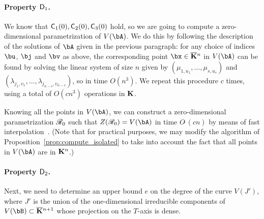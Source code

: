 \documentclass[12pt]{article}
\begin{document}
\paragraph{Property $\mathsf{D}_1$.} We know that $\mathsf{C}_1(0),\mathsf{C}_2(0),\mathsf{C}_3(0)$
hold, so we are going to compute a zero-dimensional parametrization of
$V(\bA)$.  We do this by following the description of the solutions of
$\bA$ given in the previous paragraph: for any choice of indices
$\bu$, $\bj$ and $\bv$ as above, the corresponding point $\bx \in
\KKbar{}^n$ in $V(\bA)$ can be found by solving the linear system of
size $n$ given by $(\mu_{1,u_1},\dots,\mu_{s,u_s})$ and
$(\lambda_{j_1,v_1},\dots,\lambda_{j_{n-s},v_{n-s}})$, so in time
$O(n^3)$. We repeat this procedure $c$ times, using a total of $O(c
n^3)$ operations in $\mathbf{K}$.

Knowing all the points in $V(\bA)$, we can construct a zero-dimensional
parametrization $\mathscr{R}_0$ such that $Z(\scrR_0)=V(\bA)$ in time
$O\tilde{~}(cn)$ by means of fast interpolation~\cite[Chapter~10]{GaGe03}.
(Note that for practical purposes, we may modify the algorithm
of Proposition~\ref{prop:compute_isolated} to take into account the
fact that all points in $V(\bA)$ are in $\mathbf{K}^n$.)

\paragraph{Property $\mathsf{D}_2$.} Next, we need to determine an upper bound 
$e$ on the degree of the curve $V(J')$, where $J'$ is the union of the
one-dimensional irreducible components of $V(\bB) \subset
\KKbar{}^{n+1}$ whose projection on the $T$-axis is dense.
\end{document}
